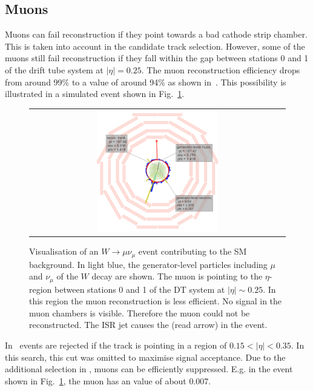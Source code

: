 \subsection*{Muons}
Muons can fail reconstruction if they point towards a bad cathode strip chamber.
This is taken into account in the candidate track selection.
However, some of the muons still fail reconstruction if they fall within the gap between stations 0 and 1 of the drift tube system at $|\eta|=0.25$.
The muon reconstruction efficiency drops from around 99\% to a value of around 94\% as shown in~\cite{bib:CMS:DT_Thesis,bib:CMS:DT_8TeV_AN}.
This possibility is illustrated in a simulated event shown in Fig.~\ref{fig:LostMuon}.
\begin{figure}[!tb]
  \centering 
  \begin{tabular}{c}
    \includegraphics[width=0.49\textwidth]{figures/analysis/Background/LostMuon_Lumi_456307_event_182377157_NEW.png}
  \end{tabular}
  \caption{Visualisation of an $W\rightarrow \mu\nu_{\mu}$ event contributing to the SM background. 
           In light blue, the generator-level particles including $\mu$ and $\nu_{\mu}$ of the $W$ decay are shown. 
           The muon is pointing to the $\eta$-region between stations 0 and 1 of the DT system at $|\eta|\sim0.25$.
           In this region the muon reconstruction is less efficient. No signal in the muon chambers is visible. Therefore the muon could not be reconstructed.
           The ISR jet causes the \met (read arrow) in the event.}
  \label{fig:LostMuon}
\end{figure}


In~\cite{bib:CMS:DT_Thesis,bib:CMS:DT_8TeV_AN} events are rejected if the track is pointing in a region of $0.15<|\eta|<0.35$.
In this search, this cut was omitted to maximise signal acceptance. 
Due to the additional selection in \ias, muons can be efficiently suppressed.
E.g. in the event shown in Fig.~\ref{fig:LostMuon}, the muon has an \ias value of about 0.007.\\

